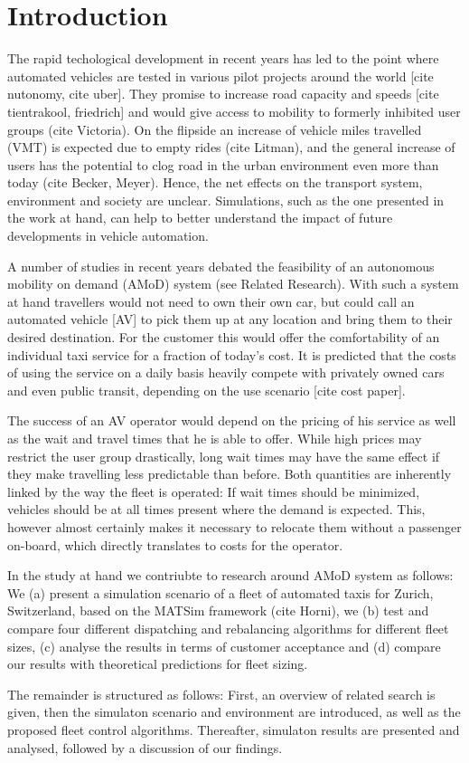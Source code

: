 \section{Introduction}

The rapid techological development in recent years has led to the point where
automated vehicles are tested in various pilot projects around the world [cite
nutonomy, cite uber]. They promise to increase road capacity and speeds
[cite tientrakool, friedrich] and would give access to mobility to formerly
inhibited user groups (cite Victoria). On the flipside an increase of vehicle
miles travelled (VMT) is expected due to empty rides (cite Litman), and the general increase
of users has the potential to clog road in the urban environment even more than today (cite Becker, Meyer).
Hence, the net effects on
the transport system, environment and society are unclear. Simulations, such as
the one presented in the work at hand, can help to better understand the impact
of future developments in vehicle automation.

A number of studies in recent years debated the feasibility of an autonomous
mobility on demand (AMoD) system (see Related Research). With such a system at hand
travellers would not need to own their own car, but could call an automated vehicle [AV]
to pick them up at any location and bring them to their desired destination. For
the customer this would offer the comfortability of an individual taxi service
for a fraction of today's cost. It is predicted that the costs of using the
service on a daily basis heavily compete with privately owned cars and even
public transit, depending on the use scenario [cite cost paper].

The success of an AV operator would depend on the pricing of his service
as well as the wait and travel times that he is able to offer. While high prices
may restrict the user group drastically, long wait times may have the same effect
if they make travelling less predictable than before. Both quantities are inherently
linked by the way the fleet is operated: If wait times should be minimized, vehicles
should be at all times present where the demand is expected. This, however almost
certainly makes it necessary to relocate them without a passenger on-board, which
directly translates to costs for the operator.

In the study at hand we contriubte to research around AMoD system as follows: We
(a) present a simulation scenario of a fleet of automated taxis for Zurich, Switzerland,
based on the MATSim framework (cite Horni), we (b) test and compare four different dispatching
and rebalancing algorithms for different fleet sizes, (c) analyse the results
in terms of customer acceptance and (d) compare our results with theoretical
predictions for fleet sizing.

The remainder is structured as follows: First, an overview of related search is
given, then the simulaton scenario and environment are introduced, as well as the
proposed fleet control algorithms. Thereafter, simulaton results are presented and
analysed, followed by a discussion of our findings.
